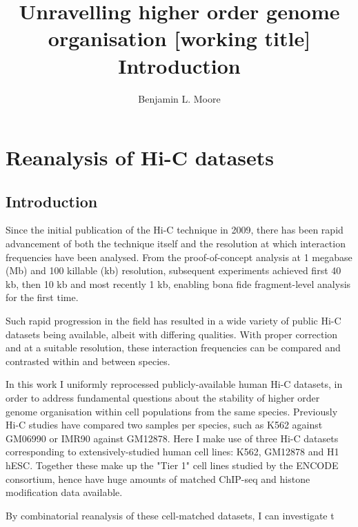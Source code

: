 \documentclass[a4paper,10pt,oneside]{book}
\title{ \vspace{3in} Unravelling higher order genome organisation {\small [working
    title]} \\ \vspace{2em} {\large {\bf Introduction}} }
\author{Benjamin L. Moore}
\begin{document}
\maketitle

\chapter{Reanalysis of Hi-C datasets}

\section{Introduction}

Since the initial publication of the Hi-C technique in 2009,\cite{Lieberman2009} there has been rapid advancement of both the technique itself and the resolution at which interaction frequencies have been analysed. From the proof-of-concept analysis at 1 megabase (Mb) and 100 killable (kb) resolution,\cite{Lieberman2009} subsequent experiments achieved first 40 kb\cite{Dixon2012}, then 10 kb\cite{Jin2013} and most recently 1 kb\cite{Rao2014}, enabling bona fide fragment-level analysis for the first time.


Such rapid progression in the field has resulted in a wide variety of public Hi-C datasets being available, albeit with differing qualities. With proper correction and at a suitable resolution, these interaction frequencies can be compared and contrasted within and between species.

In this work I uniformly reprocessed publicly-available human Hi-C datasets, in order to address fundamental questions about the stability of higher order genome organisation within cell populations from the same species. Previously Hi-C studies have compared two samples per species, such as K562 against GM06990\cite{Lieberman2009} or IMR90 against GM12878.\cite{Dixon2012} Here I make use of three Hi-C datasets corresponding to extensively-studied human cell lines: K562, GM12878 and H1 hESC. Together these make up the "Tier 1" cell lines studied by the ENCODE consortium,\cite{Dunham2012} hence have huge amounts of matched ChIP-seq and histone modification data available. 

By combinatorial reanalysis of these cell-matched datasets, I can investigate t
\end{document}
